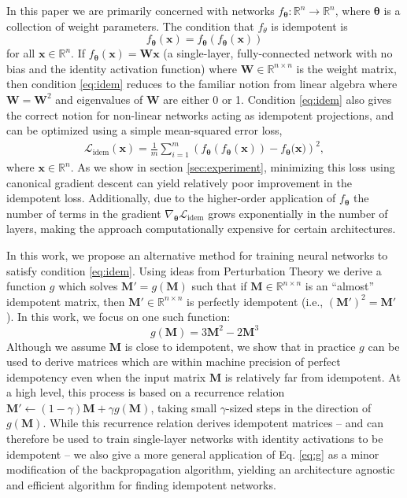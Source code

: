\documentclass{article}
\theoremstyle{plain}
\theoremstyle{definition}
\theoremstyle{remark}
\newcommand{\vx}{\mathbf{x}}
\newcommand{\vM}{\mathbf{M}}
\newcommand{\vW}{\mathbf{W}}
\newcommand{\vtheta}{\bm{\theta}}
\begin{document}
In this paper we are primarily concerned with networks $f_{\vtheta}: \mathbb{R}^n \to \mathbb{R}^n$, where $\vtheta$ is a collection of weight parameters. The condition that $f_{\theta}$ is idempotent is
%
\begin{equation}
    f_{\vtheta}(\vx) = f_{\vtheta}(f_{\vtheta}(\vx))
    \label{eq:idem}
\end{equation}
%
for all $\vx \in \mathbb{R}^n$. If $f_{\vtheta}(\vx) = \vW \vx$ (a single-layer, fully-connected network with no bias and the identity activation function) where $\vW \in \mathbb{R}^{n \times n}$ is the weight matrix, then condition \ref{eq:idem} reduces to the familiar notion from linear algebra where $\vW = \vW^2$ and eigenvalues of $\vW$ are either 0 or 1. Condition \ref{eq:idem} also gives the correct notion for non-linear networks acting as idempotent projections, and can be optimized using a simple mean-squared error loss,
%
\begin{align}
    \mathcal{L}_\text{idem}(\vx) = \frac{1}{m} \sum_{i = 1}^m \left(f_{\vtheta}(f_{\vtheta}(\vx)) - f_{\vtheta}\big(\vx \big)\right)^2,
    \label{eq:idem-loss}
\end{align}
%
where $\vx \in \mathbb{R}^{n}$. As we show in section \ref{sec:experiment}, minimizing this loss using canonical gradient descent can yield relatively poor improvement in the idempotent loss. Additionally, due to the higher-order application of $f_{\vtheta}$ the number of terms in the gradient $\nabla_{\vtheta} \mathcal{L}_{\text{idem}}$ grows exponentially in the number of layers, making the approach computationally expensive for certain architectures.

In this work, we propose an alternative method for training neural networks to satisfy condition \ref{eq:idem}. Using ideas from Perturbation Theory \cite{intro-pertub-theory} we derive a function $g$ which solves $\vM' = g(\vM)$ such that if $\vM \in \mathbb{R}^{n \times n}$ is an ``almost'' idempotent matrix, then $\vM' \in \mathbb{R}^{n \times n}$ is perfectly idempotent (i.e., $(\vM')^2 = \vM'$). In this work, we focus on one such function:
%
\begin{equation}
    g(\vM) = 3 \vM^2 - 2 \vM^3
    \label{eq:g}
\end{equation}
%
Although we assume $\vM$ is close to idempotent, we show that in practice $g$ can be used to derive matrices which are within machine precision of perfect idempotency even when the input matrix $\vM$ is relatively far from idempotent. At a high level, this process is based on a recurrence relation ${\vM' \leftarrow (1 - \gamma)\vM + \gamma g(\vM)}$, taking small $\gamma$-sized steps in the direction of $g(\vM)$. While this recurrence relation derives idempotent matrices -- and can therefore be used to train single-layer networks with identity activations to be idempotent -- we also give a more general application of Eq. \ref{eq:g} as a minor modification of the backpropagation algorithm, yielding an architecture agnostic and efficient algorithm for finding idempotent networks.
\end{document}
